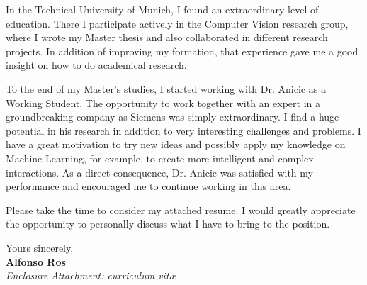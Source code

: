 \documentclass[10pt]{article}
\begin{document}
In the Technical University of Munich, I found an extraordinary level of 
education. There I participate actively in the Computer Vision research group,
where I wrote my Master thesis and also collaborated in different research 
projects. In addition of improving my formation, that experience gave me 
a good insight on how to do academical research.

To the end of my Master's studies, I started working with Dr. Anicic as a 
Working Student. The opportunity to work together with an expert in a 
groundbreaking company as Siemens was simply extraordinary. I find a huge 
potential in his research in addition to very interesting challenges and 
problems. I have a great motivation to try new ideas and possibly apply my 
knowledge on Machine Learning, for example, to create more intelligent and 
complex interactions. As a direct consequence, Dr.  Anicic was satisfied with 
my performance and encouraged me to continue working in this area.

Please take the time to consider my attached resume. I would greatly appreciate 
the opportunity to personally discuss what I have to bring to the position.

Yours sincerely,\\[1em] %
%
{\bfseries Alfonso Ros}\\[1.5em]
%
{\slshape Enclosure}
{\slshape Attachment: curriculum vit\ae{}}
\end{document}
